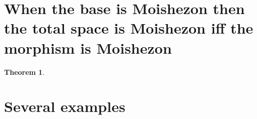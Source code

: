 \documentclass[11pt]{article}
\newtheorem{theorem}{Theorem}
\begin{document}
	\section{When the base is Moishezon then the total space is Moishezon iff the morphism is Moishezon}
	
	\begin{theorem}

	\end{theorem}
	\section{Several examples}
	
	
	\section{}
	
	
	
	
	
\end{document}
